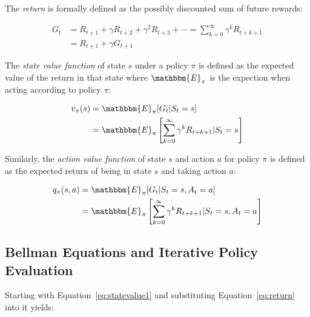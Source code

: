 The \emph{return} is formally defined as the possibly discounted sum of future rewards:

\begin{align}
G_t &= R_{t+1} + \gamma R_{t+2} + \gamma^2 R_{t+3} + \cdots = \sum_{k=0}^{\infty} \gamma^k R_{t+k+1} \nonumber \\
    &= R_{t+1} + \gamma G_{t+1} \label{eq:return}
\end{align}

The \emph{state value function} of state $s$ under a policy $\pi$ is defined as the expected value of the return in that state where $\mathbbm{E}_{\pi}$ is the expection when acting according to policy $\pi$:

\begin{align}
v_\pi(s) &= \mathbbm{E}_\pi [ G_t | S_t = s]  \label{eq:statevalue1} \\
&= \mathbbm{E}_\pi \left[ \sum_{k=0}^\infty \gamma^k R_{t + k + 1} | S_t = s \right] \nonumber
\end{align}

Similarly, the \emph{action value function} of state $s$ and action $a$ for policy $\pi$ is defined as the expected return of being in state $s$ and taking action $a$:

\begin{align}
q_\pi(s, a) &= \mathbbm{E}_\pi [ G_t | S_t = s, A_t = a] \label{eq:actionvalue} \\
&= \mathbbm{E}_\pi \left[ \sum_{k=0}^\infty \gamma^k R_{t + k + 1} | S_t = s, A_t = a \right] \nonumber
\end{align}

\subsection{Bellman Equations and Iterative Policy Evaluation}

Starting with Equation~\ref{eq:statevalue1} and substituting Equation~\ref{eq:return} into it yields:

